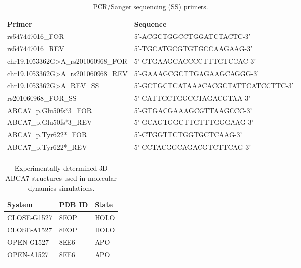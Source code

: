 \documentclass[12pt]{article}
\begin{document}
\clearpage
\begin{longtable}{p{7.5cm} p{10.5cm}}
    \caption{PCR/Sanger sequencing (SS) primers.}
    \hline
    \textbf{Primer} & \textbf{Sequence} \\
    \hline
    \hline
    rs547447016\_FOR              & 5’-ACGCTGGCCTGGATCTACTC-3’ \\
    \hline
    rs547447016\_REV              & 5’-TGCATGCGTGTGCCAAGAAG-3’ \\
    \hline
    chr19.1053362G>A\_rs201060968\_FOR   & 5’-CTGAAGCACCCCTTTGTCCAC-3’ \\
    \hline
    chr19.1053362G>A\_rs201060968\_REV   & 5’-GAAAGCGCTTGAGAAGCAGGG-3’ \\
    \hline
    chr19.1053362G>A\_REV\_SS      & 5’-GCTGCTCATAAACACGCTATTCATCCTTC-3’ \\
    \hline
    rs201060968\_FOR\_SS          & 5’-CATTGCTGGCCTAGACGTAA-3’ \\
    \hline
    ABCA7\_p.Glu50fs*3\_FOR       & 5’-GTGACGAAAGCGTTAAGCCC-3’ \\
    \hline
    ABCA7\_p.Glu50fs*3\_REV       & 5’-GCAGTGGCTTGTTTGGGAAG-3’ \\
    \hline
    ABCA7\_p.Tyr622*\_FOR         & 5’-CTGGTTCTGGTGCTCAAG-3’ \\
    \hline
    ABCA7\_p.Tyr622*\_REV         & 5’-CCTACGGCAGACGTCTTCAG-3’ \\
    \label{tab:pcr_primers}
\end{longtable}

\clearpage
\begin{longtable}{p{6cm} p{5cm} p{6cm}}
    \caption{Experimentally-determined 3D ABCA7 structures used in molecular dynamics simulations.}
    \hline
    \textbf{System}    & \textbf{PDB ID} & \textbf{State} \\
    \hline
    \hline
    CLOSE-G1527        & 8EOP           & HOLO         \\
    \hline
    CLOSE-A1527        & 8EOP           & HOLO         \\
    \hline
    OPEN-G1527         & 8EE6           & APO          \\
    \hline
    OPEN-A1527         & 8EE6           & APO          \\
    \hline
    \label{tab:abca7_structures}
\end{longtable}
\end{document}
